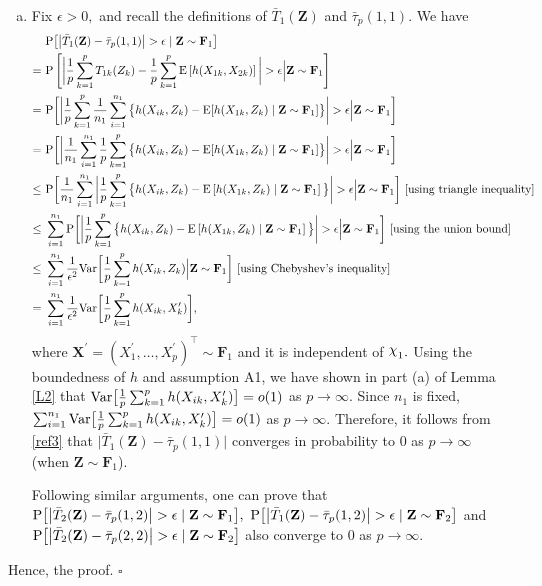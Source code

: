 \documentclass[twoside]{article}
\newcommand{\bX}{\mathbf{X}}
\newcommand{\bZ}{\mathbf{Z}}
\newcommand{\bF}{\mathbf{F}}
\newcommand{\0}{\mathbf{0}}
\newcommand{\1}{\mathbf{1}}
\newcommand*{\QEDB}{\hfill\ensuremath{\square}}
\DeclareRobustCommand{\rchi}{{\mathpalette\irchi\relax}}
\newcommand{\irchi}[2]{\raisebox{\depth}{$#1\chi$}} %
\numberwithin{equation}{section}
\begin{document}
\begin{enumerate}[(a)]
\item Fix $\epsilon>0,$ and recall the definitions of $\bar{T}_{1}(\bZ)$ and $\bar{\tau}_p(1,1)$. We have
\begin{align}\label{ref3}
&\ {\rm P}\big [\big |\bar{T}_{1}(\bZ) - \bar{\tau}_p(1,1)\big |>\epsilon\mid \bZ\sim\bF_1\big ]\nonumber \\
= &\ {\rm P}\left [\bigg |\frac{1}{p}\sum_{k=1}^p T_{1k}(Z_k) - \frac{1}{p}\sum_{k=1}^p {\rm E}\left [ h(X_{1k},X_{2k})\right ]\bigg |>\epsilon\Big | \bZ\sim\bF_1 \right ]\nonumber \\
= &\ {\rm P}\bigg [\bigg |\frac{1}{p}\sum_{k=1}^p \frac{1}{n_1}\sum_{i=1}^{n_1}\big \{h(X_{ik},Z_k) - {\rm E}[h(X_{1k},Z_k)\mid \bZ\sim\bF_1]\big \}\bigg |>\epsilon\Big | \bZ\sim\bF_1 \bigg ]\nonumber \\
= &\ {\rm P}\bigg [\bigg |\frac{1}{n_1}\sum_{i=1}^{n_1}\frac{1}{p}\sum_{k=1}^p\big \{h(X_{ik},Z_k) - {\rm E}[h(X_{1k},Z_k)\mid \bZ\sim\bF_1]\big \}\bigg |>\epsilon\Big | \bZ\sim\bF_1 \bigg ]\nonumber \\
\leq &\ {\rm P}\bigg [\frac{1}{n_1}\sum_{i=1}^{n_1}\bigg |\frac{1}{p}\sum_{k=1}^p\big \{h(X_{ik},Z_k) - {\rm E}\left [h(X_{1k},Z_k)\mid \bZ\sim\bF_1\right ]\big \}\bigg |>\epsilon\Big | \bZ\sim\bF_1 \bigg ]\ [\text{using triangle inequality}]\nonumber \\
\leq &\ \sum_{i=1}^{n_1}{\rm P}\bigg [\bigg |\frac{1}{p}\sum_{k=1}^p\big \{h(X_{ik},Z_k) - {\rm E}\left [h(X_{1k},Z_k)\mid \bZ\sim\bF_1\right ]\big \}\bigg |>\epsilon\Big | \bZ\sim\bF_1 \bigg ]\ [\text{using the union bound}]\nonumber \\
\leq &\ \sum_{i=1}^{n_1}\frac{1}{\epsilon^2}{\rm Var}\bigg [\frac{1}{p}\sum_{k=1}^p h(X_{ik},Z_k)\Big | \bZ\sim \bF_1\bigg ]\ [\text{using Chebyshev's inequality}]\nonumber \\
=&\  \sum_{i=1}^{n_1}\frac{1}{\epsilon^2}{\rm Var}\bigg [\frac{1}{p}\sum_{k=1}^p h(X_{ik},X^\prime_k)\bigg ],
\end{align}
where $\bX^\prime=(X^\prime_1,\ldots, X^\prime_p)^\top\sim\bF_1$ and it is independent of $\rchi_1.$ Using the boundedness of $h$ and assumption A1, we have shown in part (a) of Lemma \ref{L2} that ${\rm Var}\big [\frac{1}{p}\sum_{k=1}^p h(X_{ik},X^\prime_k)\big ]=o(1)$ as $p\to\infty$. Since $n_1$ is fixed, $\sum_{i=1}^{n_1}{\rm Var}\big [\frac{1}{p}\sum_{k=1}^p h(X_{ik},X^\prime_k)\big ]=o(1)$ as $p\to\infty$. Therefore, it follows from \eqref{ref3} that $\big |\bar{T}_{1}(\bZ) - \bar{\tau}_p(1,1)\big |$ converges in probability to 0 as $p\to\infty$ (when $\bZ\sim\bF_1$).

Following similar arguments, one can prove that $
{\rm P}\big[\big |\bar{T}_{2}(\bZ) - \bar{\tau}_p(1,2)\big |>\epsilon\mid\bZ\sim\bF_1\big ],\ {\rm P}\big[\big |\bar{T}_{1}(\bZ) - \bar{\tau}_p(1,2)\big |>\epsilon\mid\bZ\sim\bF_2\big ]$ and ${\rm P}\big[\big |\bar{T}_{2}(\bZ) - \bar{\tau}_p(2,2)\big |>\epsilon\mid\bZ\sim\bF_2\big ]$ also converge to 0 as $p\to\infty.$
\end{enumerate}
Hence, the proof. \hfill \QEDB\newline
\end{document}
